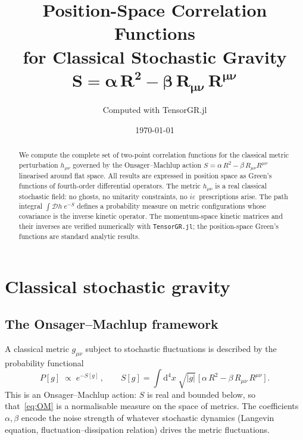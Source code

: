 \documentclass[11pt,a4paper]{article}
\title{Position-Space Correlation Functions\\
for Classical Stochastic Gravity\\[4pt]
$\boldsymbol{S = \alpha\, R^2 - \beta\, R_{\mu\nu}\,R^{\mu\nu}}$}
\author{Computed with TensorGR.jl}
\date{\today}
\newcommand{\dd}{\mathrm{d}}
\theoremstyle{definition}
\theoremstyle{remark}
\begin{document}
\maketitle

\begin{abstract}
We compute the complete set of two-point correlation functions for
the classical metric perturbation $h_{\mu\nu}$ governed by the
Onsager--Machlup action
$S = \alpha\,R^2 - \beta\,R_{\mu\nu}R^{\mu\nu}$
linearised around flat space.
All results are expressed in position space as Green's functions
of fourth-order differential operators.
The metric $h_{\mu\nu}$ is a real classical stochastic field:
no ghosts, no unitarity constraints, no $i\varepsilon$~prescriptions
arise.  The path integral $\int\!\mathcal{D}h\;e^{-S}$ defines a
probability measure on metric configurations whose covariance is
the inverse kinetic operator.
The momentum-space kinetic matrices and their inverses are verified
numerically with \texttt{TensorGR.jl}; the position-space Green's
functions are standard analytic results.
\end{abstract}

\tableofcontents

\section{Classical stochastic gravity}
\label{sec:setup}

\subsection{The Onsager--Machlup framework}

A classical metric $g_{\mu\nu}$ subject to stochastic fluctuations is
described by the probability functional
\begin{equation}\label{eq:OM}
  P[g] \;\propto\; e^{-S[g]}\,,
  \qquad
  S[g] = \int \dd^4 x\;\sqrt{|g|}\;\bigl[\,
    \alpha\,R^2 - \beta\,R_{\mu\nu}\,R^{\mu\nu}
  \,\bigr]\,.
\end{equation}
This is an Onsager--Machlup action: $S$ is real and bounded below, so
that~\eqref{eq:OM} is a normalisable measure on the space of metrics.
The coefficients $\alpha,\beta$ encode the noise strength of whatever
stochastic dynamics (Langevin equation, fluctuation--dissipation relation)
drives the metric fluctuations.
\end{document}
